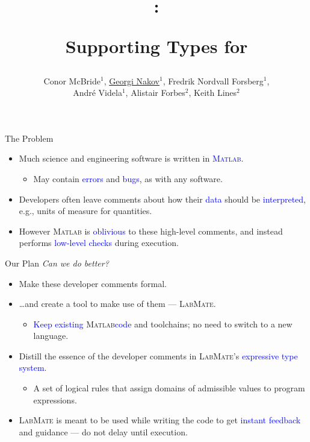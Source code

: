 \documentclass[]{beamer}
\title{\huge \lm: \\ \centerline{Supporting Types for \ma} }
\author[McBride, Nakov, Nordvall Forsberg et al]{\small Conor McBride$^{1}$, \underline{Georgi Nakov}$^{1}$, Fredrik Nordvall Forsberg$^{1}$,\\ Andr\'e Videla$^{1}$, Alistair Forbes$^{2}$, Keith Lines$^{2}$}
\institute[]{$^{1}$University of Strathclyde, UK\\$^{2}$National Physical Laboratory, UK}
\newcommand{\keyword}[1]{\textcolor{blue}{#1}}
\newcommand{\lm}{\textsc{LabMate}\xspace}
\newcommand{\ma}{\textsc{Matlab}\xspace}
\begin{document}
\begin{frame}[plain]
  \titlepage
\end{frame}

\setcounter{framenumber}{0}

\begin{frame}{The Problem}
  \begin{itemize}[<+->]
  \item Much science and engineering software is written in \keyword{\ma}.
    \smallskip
    \begin{itemize}[<.->]
    \item May contain \keyword{errors} and \keyword{bugs}, as with any software.
    \end{itemize}
    \bigskip
  \item Developers often leave comments about how their
    \keyword{data} should be \keyword{interpreted}, e.g., units of measure for
    quantities.
    \bigskip
  \item However \ma is \keyword{oblivious} to these high-level
    comments, and instead performs \keyword{low-level checks} during
    execution.
  \end{itemize}
\end{frame}

\begin{frame}{Our Plan}
  \textit{Can we do better?}

  \begin{itemize}[<+->]
    \medskip
  \item Make these developer comments formal.
    \medskip
  \item \ldots and create a tool to make use of them --- \lm.
    \begin{itemize}[<.->]
      \smallskip
    \item \keyword{Keep existing} \ma \keyword{code} and toolchains; no need to
      switch to a new language.
    \end{itemize}
    \medskip
  \item Distill the essence of the developer comments in
    \lm's \keyword{expressive type system}.
    \begin{itemize}[<.->]
      \smallskip
    \item A set of logical rules that assign domains of admissible
      values to program expressions.
    \end{itemize}
    \medskip
  \item \lm is meant to be used while writing the code to get
    \keyword{instant feedback} and guidance --- do not delay until
    execution.
  \end{itemize}
\end{frame}
\end{document}
